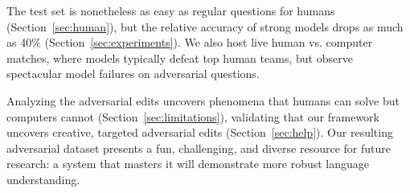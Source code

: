 The \challenge{} test set is nonetheless as easy as
regular questions for humans (Section~\ref{sec:human}), but
the relative accuracy of strong  models drops as much as 40\%
(Section~\ref{sec:experiments}).
We also host live human vs. computer matches, where models typically defeat
top human teams, but observe spectacular model failures
on adversarial questions.

Analyzing the adversarial edits uncovers phenomena
that humans can solve but computers cannot
(Section~\ref{sec:limitations}), validating that our framework
uncovers creative, targeted adversarial edits (Section~\ref{sec:help}).
Our resulting adversarial dataset presents a fun, challenging,
and diverse resource for future  research: a system that masters
it will demonstrate more robust language understanding.